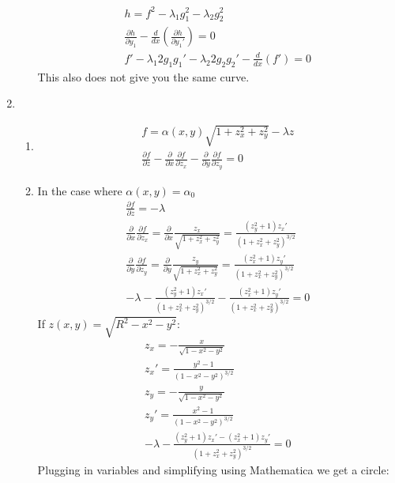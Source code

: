 \documentclass[12pt]{article}
\newcommand{\p}[2]{\frac{\partial #1}{\partial #2}}
\begin{document}
\begin{enumerate}
\begin{enumerate}
\begin{gather*}
        h=f^2-\lambda_1 g_1^2-\lambda_2 g_2^2\\
        \frac{\partial h}{\partial y_1}-\frac{d}{dx}\left(\frac{\partial h}{\partial y_1'}\right)=0\\
        f'-\lambda_1 2g_1 g_1'-\lambda_2 2g_2 g_2'-\frac{d}{dx}\left(f'\right)=0
      \end{gather*}
      This also does not give you the same curve.
    \end{enumerate}
    \item
    \begin{enumerate}
      \item
      \begin{gather*}
        f=\alpha(x,y)\sqrt{1+z_x^2+z_y^2}-\lambda z\\
        \frac{\partial f}{\partial z}-\frac{\partial}{\partial x}\frac{\partial f}{\partial z_x}-\frac{\partial}{\partial y}\frac{\partial f}{\partial z_y}=0
      \end{gather*}
      \item
      In the case where $\alpha(x,y)=\alpha_0$
      \begin{gather*}
        \frac{\partial f}{\partial z}=-\lambda\\
        \frac{\partial}{\partial x}\frac{\partial f}{\partial z_x}=\p{}{x}\frac{z_x}{\sqrt{1+z_x^2+z_y^2}}=\frac{(z_y^2+1)z_x'}{\left( 1+z_x^2+z_y^2 \right)^{3/2}}\\
        \frac{\partial}{\partial y}\frac{\partial f}{\partial z_y}=\p{}{y}\frac{z_y}{\sqrt{1+z_x^2+z_y^2}}=\frac{(z_x^2+1)z_y'}{\left( 1+z_x^2+z_y^2 \right)^{3/2}}\\
        -\lambda-\frac{(z_y^2+1)z_x'}{\left( 1+z_x^2+z_y^2 \right)^{3/2}}-\frac{(z_x^2+1)z_y'}{\left( 1+z_x^2+z_y^2 \right)^{3/2}}=0
      \end{gather*}
      If $z(x,y)=\sqrt{R^2-x^2-y^2}$:
      \begin{gather*}
        z_x=-\frac{x}{\sqrt{1-x^2-y^2}}\\
        z_x'=\frac{y^2-1}{\left(1-x^2-y^2\right)^{3/2}}\\
        z_y=-\frac{y}{\sqrt{1-x^2-y^2}}\\
        z_y'=\frac{x^2-1}{\left(1-x^2-y^2\right)^{3/2}}\\
        -\lambda-\frac{(z_y^2+1)z_x'-(z_x^2+1)z_y'}{\left( 1+z_x^2+z_y^2 \right)^{3/2}}=0
      \end{gather*}
      Plugging in variables and simplifying using Mathematica we get a circle:
      \begin{gather*}

\end{gather*}
\end{enumerate}
\end{enumerate}
\end{document}
